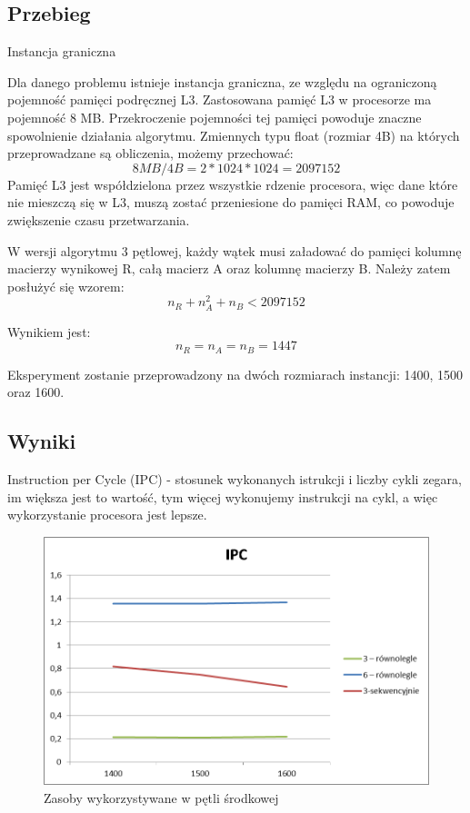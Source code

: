 \documentclass{article}
\begin{document}
\subsection{Przebieg}
Instancja graniczna

Dla danego problemu istnieje instancja graniczna, ze względu na ograniczoną pojemność pamięci podręcznej L3. Zastosowana pamięć L3 w procesorze ma pojemność 8 MB. Przekroczenie pojemności tej pamięci powoduje znaczne spowolnienie działania algorytmu. Zmiennych typu float (rozmiar 4B) na których przeprowadzane są obliczenia, możemy przechować: 
\[ 8MB/4B = 2 * 1024 * 1024 = 2097152 \]
Pamięć L3 jest współdzielona przez wszystkie rdzenie procesora, więc dane które nie mieszczą się w L3, muszą zostać przeniesione do pamięci RAM, co powoduje zwiększenie czasu przetwarzania.

W wersji algorytmu 3 pętlowej, każdy wątek musi załadować do pamięci kolumnę macierzy wynikowej R, całą macierz A oraz kolumnę macierzy B.
Należy zatem posłużyć się wzorem:
\[ n_R + n_A^2 + n_B < 2097152 \]

Wynikiem jest:
\[ n_R = n_A = n_B = 1447\]

Eksperyment zostanie przeprowadzony na dwóch rozmiarach instancji: 1400,  1500 oraz 1600.


\subsection{Wyniki}
Instruction per Cycle (IPC) - stosunek wykonanych istrukcji i liczby cykli zegara, im większa jest to wartość, tym więcej wykonujemy instrukcji na cykl, a więc wykorzystanie procesora jest lepsze.

\begin{figure}[H]
	\centering
	\includegraphics[bb=0 0 1280 960]{./images/wykresy/IPC.png}
	\caption{Zasoby wykorzystywane w pętli środkowej}
	\label{fig:3medium}
\end{figure}
\end{document}
